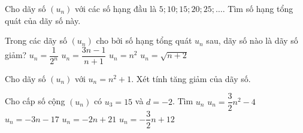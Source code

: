 \begin{ex}%
	Cho dãy số $(u_n)$ với các số hạng đầu là $5;10;15;20;25;\ldots$. Tìm số hạng tổng quát của dãy số này. 
\end{ex}

\begin{ex}%
	Trong các dãy số $( u_n)$ cho bởi số  hạng tổng quát $u_n$ sau, dãy số nào là dãy số giảm?
	 \choice
		{  \True $u_n=\dfrac{1}{{{2}^{n}}}$}
		{ $u_n=\dfrac{3n-1}{n+1}$} 
		{ $u_n={{n}^2}$} 
		 { $u_n=\sqrt{n+2}$}
\end{ex}

\begin{ex}%
	Cho dãy số $( u_n)$ với $u_n={{n}^2}+1$. Xét tính tăng giảm  của dãy số.
\end{ex}

\begin{ex}%
	 Cho cấp số cộng $({{u}_{n}})$ có ${{u}_{3}}=15$ và $d=-2$. Tìm ${{u}_{n}}$
	 \choice
		{ ${{u}_{n}}=\dfrac{3}{2}{{n}^2}-4$} 
		{ ${{u}_{n}}=-3n-17$} 
		{ \True  ${{u}_{n}}=-2n+21$}
		{  ${{u}_{n}}=-\dfrac{3}{2}n+12$}
\end{ex}

